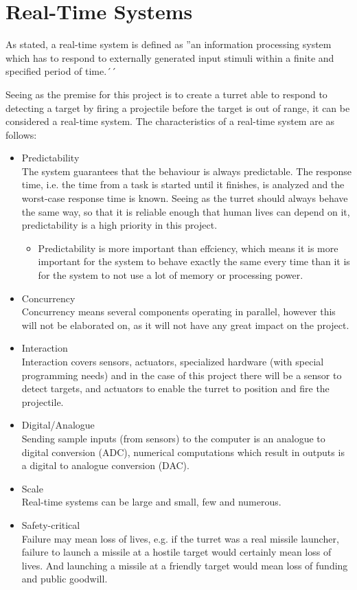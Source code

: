 \section{Real-Time Systems}

As stated, a real-time system is defined as ''an information processing system which has to respond to externally generated input stimuli within a finite and specified period of time.´´ \cite{realtime} 

Seeing as the premise for this project is to create a turret able to respond to detecting a target by firing a projectile before the target is out of range, it can be considered a real-time system. The characteristics of a real-time system are as follows:
\begin{itemize}
	\item {Predictability} \\ The system guarantees that the behaviour is always predictable. The response time, i.e. the time from a task is started until it finishes, is analyzed and the worst-case response time is known. Seeing as the turret should always behave the same way, so that it is reliable enough that human lives can depend on it, predictability is a high priority in this project.
		\begin{itemize}
			\item Predictability is more important than effciency, which means it is more important for the system to behave exactly the same every time than it is for the system to not use a lot of memory or processing power.
		\end{itemize}
	\item {Concurrency} \\ Concurrency means several components operating in parallel, however this will not be elaborated on, as it will not have any great impact on the project. 
	\item {Interaction} \\ Interaction covers sensors, actuators, specialized hardware (with special programming needs) and in the case of this project there will be a sensor to detect targets, and actuators to enable the turret to position and fire the projectile.
	\item {Digital/Analogue} \\ Sending sample inputs (from sensors) to the computer is an analogue to digital conversion (ADC), numerical computations which result in outputs is a digital to analogue conversion (DAC).
	\item {Scale} \\ Real-time systems can be large and small, few and numerous.
	\item {Safety-critical} \\ Failure may mean loss of lives, e.g. if the turret was a real missile launcher, failure to launch a missile at a hostile target would certainly mean loss of lives. And launching a missile at a friendly target would mean loss of funding and public goodwill.
\end{itemize}\cite{realtime}

